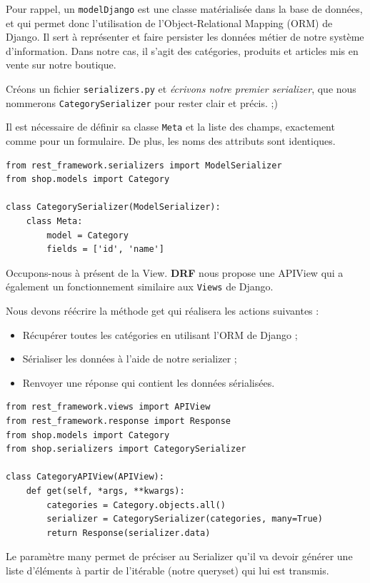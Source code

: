 \begin{theorem}
Pour rappel, un {\tt modelDjango} est une classe matérialisée dans la base de données, et qui permet donc l’utilisation de l’Object-Relational Mapping ({\color{monOrange}ORM}) de Django. Il sert à représenter et faire persister les données métier de notre système d’information. Dans notre cas, il s’agit des catégories, produits et articles mis en vente sur notre boutique.
\end{theorem}
Créons un fichier  {\tt serializers.py}  et {\em écrivons notre premier {\color{monOrange}serializer}}, que nous nommerons  {\tt CategorySerializer}  pour rester clair et précis. ;)

Il est nécessaire de définir sa classe  {\tt Meta}  et la liste des champs, exactement comme pour un formulaire. De plus, les noms des attributs sont identiques.
\begin{verbatim}
from rest_framework.serializers import ModelSerializer
from shop.models import Category
 
class CategorySerializer(ModelSerializer):
    class Meta:
        model = Category
        fields = ['id', 'name']

\end{verbatim}
Occupons-nous à présent de la {\color{monOrange}View}. {\bf DRF} nous propose une  {\color{monOrange}APIView}  qui a également un fonctionnement similaire aux  {\tt Views}  de Django.

Nous devons réécrire la méthode  {\color{monOrange}get}  qui réalisera les actions suivantes :
\begin{itemize}
\item Récupérer toutes les catégories en utilisant l’ORM de Django ;
\item Sérialiser les données à l’aide de notre serializer ;
\item Renvoyer une réponse qui contient les données sérialisées.
\end{itemize}
\begin{verbatim}
from rest_framework.views import APIView
from rest_framework.response import Response
from shop.models import Category
from shop.serializers import CategorySerializer
 
class CategoryAPIView(APIView):
    def get(self, *args, **kwargs):
        categories = Category.objects.all()
        serializer = CategorySerializer(categories, many=True)
        return Response(serializer.data)
\end{verbatim}
Le paramètre  {\color{monOrange}many}  permet de préciser au {\color{monOrange}Serializer} qu’il va devoir générer une liste d’éléments à partir de l’itérable (notre {\color{monOrange}queryset}) qui lui est transmis.

